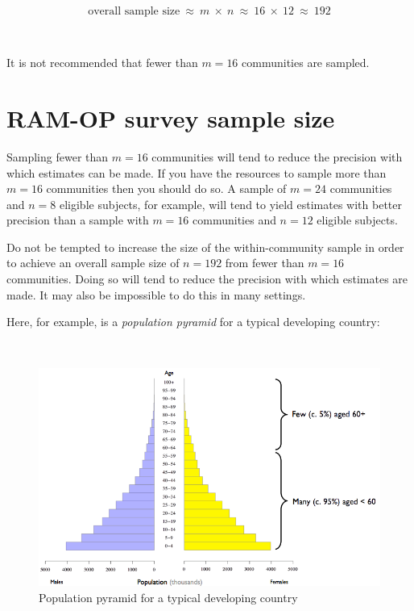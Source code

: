 \documentclass[12pt,]{book}
\theoremstyle{definition}
\theoremstyle{definition}
\theoremstyle{definition}
\theoremstyle{remark}
\begin{document}
~

\[ \text{overall sample size} ~ \approx ~ m ~ \times ~ n ~ \approx ~ 16 ~ \times ~ 12 ~ \approx ~ 192 \]

~

It is not recommended that fewer than \(m = 16\) communities are
sampled.

\hypertarget{ram-op-survey-sample-size-1}{%
\section{RAM-OP survey sample size}\label{ram-op-survey-sample-size-1}}

Sampling fewer than \(m = 16\) communities will tend to reduce the
precision with which estimates can be made. If you have the resources to
sample more than \(m = 16\) communities then you should do so. A sample
of \(m = 24\) communities and \(n = 8\) eligible subjects, for example,
will tend to yield estimates with better precision than a sample with
\(m = 16\) communities and \(n = 12\) eligible subjects.

Do not be tempted to increase the size of the within-community sample in
order to achieve an overall sample size of \(n = 192\) from fewer than
\(m = 16\) communities. Doing so will tend to reduce the precision with
which estimates are made. It may also be impossible to do this in many
settings.

Here, for example, is a \emph{population pyramid} for a typical
developing country:

~

\begin{figure}

{\centering \includegraphics[width=10.17in]{figures/popPyramid} 

}

\caption{Population pyramid for a typical developing country}\label{fig:sample2}
\end{figure}
\end{document}
